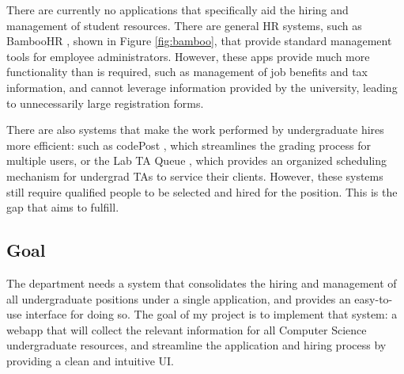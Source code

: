 There are currently no applications that specifically aid the hiring and management of student resources. There are general HR systems, such as BambooHR \cite{bamboo}, shown in Figure \ref{fig:bamboo}, that provide standard management tools for employee administrators. However, these apps provide much more functionality than is required, such as management of job benefits and tax information, and cannot leverage information provided by the university, leading to unnecessarily large registration forms.

There are also systems that make the work performed by undergraduate hires more efficient: such as codePost \cite{codePost}, which streamlines the grading process for multiple users, or the Lab TA Queue \cite{lab-ta-queue}, which provides an organized scheduling mechanism for undergrad TAs to service their clients. However, these systems still require qualified people to be selected and hired for the position. This is the gap that \tigeruhr{} aims to fulfill.

\subsection{Goal}

The department needs a system that consolidates the hiring and management of all undergraduate positions under a single application, and provides an easy-to-use interface for doing so. The goal of my project is to implement that system: a webapp that will collect the relevant information for all Computer Science undergraduate resources, and streamline the application and hiring process by providing a clean and intuitive UI.
